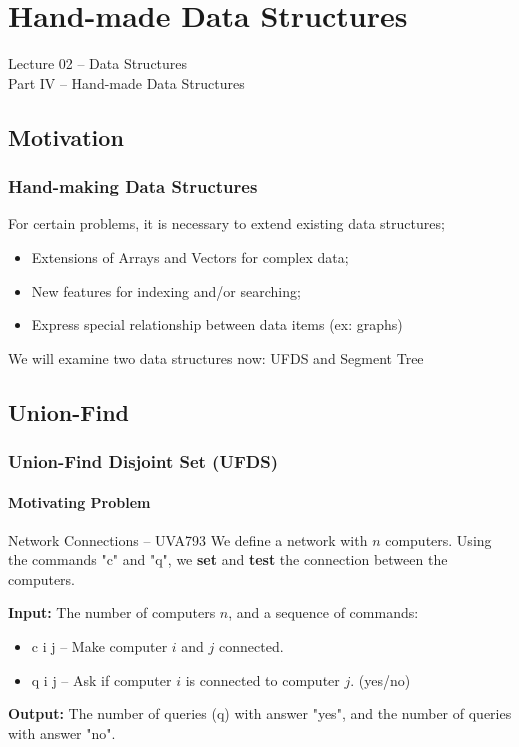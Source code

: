 \section{Hand-made Data Structures}
\begin{frame}
  \begin{center}
    {\large Lecture 02 -- Data Structures\\Part IV -- Hand-made Data Structures}\\
  \end{center}
\end{frame}

\subsection{Motivation}
\begin{frame}
  \frametitle{Hand-making Data Structures}

  \begin{block}{}
    For certain problems, it is necessary to extend existing data structures;
  \end{block}

  \begin{itemize}
    \item Extensions of Arrays and Vectors for complex data;
    \bigskip

    \item New features for indexing and/or searching;
    \bigskip

    \item Express special relationship between data items (ex: graphs)
  \end{itemize}\bigskip

  We will examine two data structures now: UFDS and Segment Tree
\end{frame}

\subsection{Union-Find}
\begin{frame}
  \frametitle{Union-Find Disjoint Set (UFDS)}
  \framesubtitle{Motivating Problem}

  \begin{block}{Network Connections -- UVA793}
    We define a network with $n$ computers. Using the commands "c" and "q", we {\bf set} and {\bf test} the connection between the computers.
    \bigskip

    {\bf Input:} The number of computers $n$, and a sequence of commands:
    \begin{itemize}
    \item c i j -- Make computer $i$ and $j$ connected.
    \item q i j -- Ask if computer $i$ is connected to computer $j$. (yes/no)
    \end{itemize}

    \bigskip
    {\bf Output:} The number of queries (q) with answer "yes", and the number
    of queries with answer "no".
  \end{block}
\end{frame}

